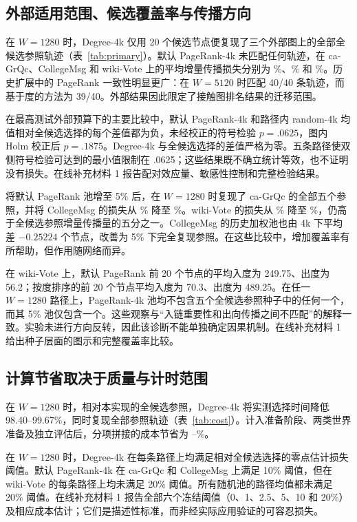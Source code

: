 \documentclass[smallextended]{svjour3}
\begin{document}
\subsection{外部适用范围、候选覆盖率与传播方向}
在 $W=1280$ 时，Degree-4k 仅用 20 个候选节点便复现了三个外部图上的全部全候选参照轨迹（表~\ref{tab:primary}）。默认 PageRank-4k 未匹配任何轨迹，在 ca-GrQc、CollegeMsg 和 wiki-Vote 上的平均增量传播损失分别为 \GrqcPRLoss{}\%、\CollegePRLoss{}\% 和 \WikiPRLoss{}\%。历史扩展中的 PageRank 一致性明显更广：在 $W=5120$ 时匹配 40/40 条轨迹，而基于度的方法为 39/40。外部结果因此限定了接触图排名结果的迁移范围。


在最高测试外部预算下的主要比较中，默认 PageRank-4k 和路径内 random-4k 均值相对全候选选择的每个差值都为负，未经校正的符号检验 $p=.0625$，图内 Holm 校正后 $p=.1875$。Degree-4k 与全候选选择的差值严格为零。五条路径使双侧符号检验可达到的最小值限制在 .0625；这些结果既不确立统计等效，也不证明没有损失。在线补充材料 1 报告配对效应量、敏感性控制和完整检验结果。

将默认 PageRank 池增至 5\% 后，在 $W=1280$ 时复现了 ca-GrQc 的全部五个参照，并将 CollegeMsg 的损失从 \CollegePRLoss{}\% 降至 \CollegePRfiveLoss{}\%。wiki-Vote 的损失从 \WikiPRLoss{}\% 降至 \WikiPRfiveLoss{}\%，仍高于全候选参照增量传播量的五分之一。CollegeMsg 的历史加权池也由 4k 下平均差 $-0.25224$ 个节点，改善为 5\% 下完全复现参照。在这些比较中，增加覆盖率有所帮助，但作用随网络而异。

在 wiki-Vote 上，默认 PageRank 前 20 个节点的平均入度为 249.75、出度为 56.2；按度排序的前 20 个节点平均入度为 70.3、出度为 489.25。在任一 $W=1280$ 路径上，PageRank-4k 池均不包含五个全候选参照种子中的任何一个，而其 5\% 池仅包含一个。这些观察与“入链重要性和出向传播之间不匹配”的解释一致。实验未进行方向反转，因此该诊断不能单独确定因果机制。在线补充材料 1 给出种子层面的图示和完整覆盖率比较。

\subsection{计算节省取决于质量与计时范围}
在 $W=1280$ 时，相对本实现的全候选参照，Degree-4k 将实测选择时间降低 98.40--99.67\%，同时复现全部参照轨迹（表~\ref{tab:cost}）。计入准备阶段、两类世界准备及独立评估后，分项拼接的成本节省为 \CollegeDegreeSaving{}--\WikiDegreeSaving{}\%。


在 $W=1280$ 时，Degree-4k 在每条路径上均满足相对全候选选择的零点估计损失阈值。默认 PageRank-4k 在 ca-GrQc 和 CollegeMsg 上满足 10\% 阈值，但在 wiki-Vote 的每条路径上均未满足 20\% 阈值。所有随机池的路径均值都未满足 20\% 阈值。在线补充材料 1 报告全部六个冻结阈值（0、1、2.5、5、10 和 20\%）及相应成本估计；它们是描述性标准，而非经实际应用验证的可容忍损失。
\end{document}
